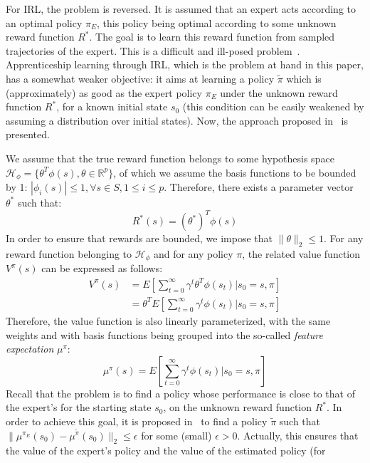 \documentclass{llncs}
\begin{document}
For IRL, the problem is reversed. It is
assumed that an expert acts according to an optimal policy $\pi_E$,
this policy being optimal according to some unknown reward function
$R^*$. The goal is to learn this
reward function from sampled trajectories of the expert. This is a
difficult and ill-posed problem~\citep{ng2000algorithms}. Apprenticeship
learning through IRL, which is the problem at hand in this paper,
has a somewhat weaker objective: it aims at learning a policy
$\tilde{\pi}$ which is (approximately) as good as the expert policy
$\pi_E$ under the unknown reward function $R^*$, for a known initial
state $s_0$ (this condition can be easily weakened by assuming a
distribution over initial states). Now, the approach proposed in~\citep{abbeel2004apprenticeship} is
presented.

We assume that the true reward function belongs to some hypothesis
space $\mathcal{H}_\phi = \{\theta^T \phi(s),
\theta\in\mathbb{R}^p\}$, of which we assume the basis functions to
be bounded by 1: $|\phi_i(s)|\leq 1, \forall s\in S, 1\leq i \leq
p$. Therefore, there exists a parameter vector $\theta^*$ such that:
\begin{equation}
  R^*(s) = (\theta^*)^T \phi(s)
\end{equation}
In order to ensure that rewards are bounded, we impose that
$\|\theta\|_2\leq 1$. For any reward function belonging to
$\mathcal{H}_\phi$ and for any policy $\pi$, the related value
function $V^\pi(s)$ can be expressed as follows:
\begin{align}
  V^\pi(s) &= E[\sum_{t=0}^\infty \gamma^t \theta^T \phi(s_t)|s_0=s, \pi]
  \\
  &= \theta^T  E[\sum_{t=0}^\infty \gamma^t \phi(s_t)|s_0=s, \pi]
\end{align}
Therefore, the value function is also linearly parameterized, with
the same weights and with basis functions being grouped into the
so-called \emph{feature expectation} $\mu^\pi$:
\begin{equation}
  \mu^\pi(s) = E[\sum_{t=0}^\infty \gamma^t \phi(s_t)|s_0=s, \pi]
\end{equation}
Recall that the problem is to find a policy whose performance is
close to that of the expert's for the starting state $s_0$, on the
unknown reward function $R^*$. In order to achieve this goal, it is
proposed in~\citep{abbeel2004apprenticeship} to find a policy $\tilde{\pi}$ such
that $\|\mu^{\pi_E}(s_0)-\mu^{\tilde{\pi}}(s_0)\|_2\leq \epsilon$
for some (small) $\epsilon>0$. Actually, this ensures that the value
of the expert's policy and the value of the estimated policy (for
\end{document}
